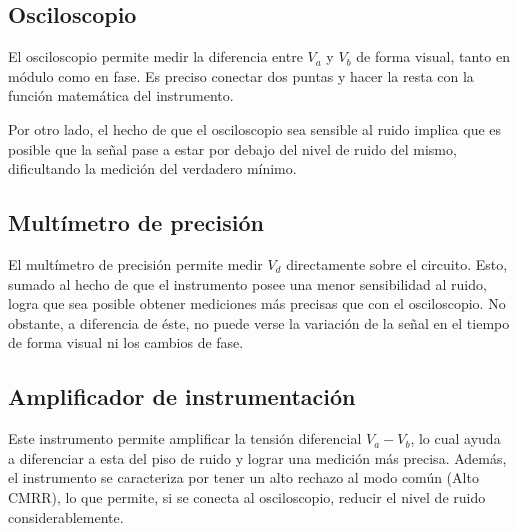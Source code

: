 \subsection{Osciloscopio}
El osciloscopio permite medir la diferencia entre $V_a$ y $V_b$ de forma visual, tanto en módulo como en fase. Es preciso conectar dos puntas y hacer la resta con la función matemática del instrumento. 

Por otro lado, el hecho de que el osciloscopio sea sensible al ruido implica que es posible que la señal pase a estar por debajo del nivel de ruido del mismo, dificultando la medición del verdadero mínimo.

\subsection{Multímetro de precisión}
El multímetro de precisión permite medir $V_d$ directamente sobre el circuito. Esto, sumado al hecho de que el instrumento posee una menor sensibilidad al ruido, logra que sea posible obtener mediciones más precisas que con el osciloscopio. No obstante, a diferencia de éste, no puede verse la variación de la señal en el tiempo de forma visual ni los cambios de fase.

\subsection{Amplificador de instrumentación}
Este instrumento permite amplificar la tensión diferencial $V_a-V_b$, lo cual ayuda a diferenciar a esta del piso de ruido y lograr una medición más precisa. Además, el instrumento se caracteriza por tener un alto rechazo al modo común (Alto CMRR), lo que permite, si se conecta al osciloscopio, reducir el nivel de ruido considerablemente.
